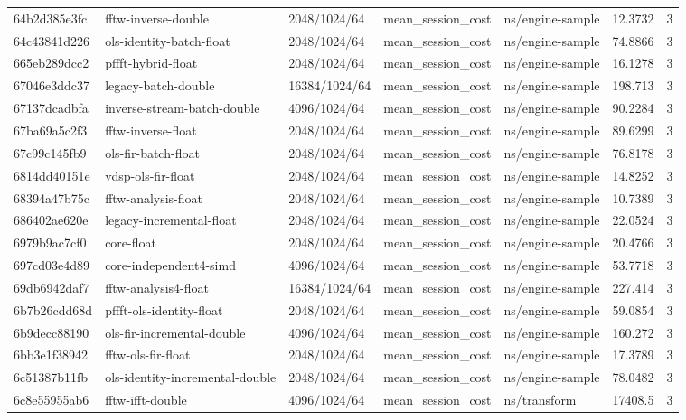\begin{longtable}{lllllrr}
64b2d385e3fc & fftw-inverse-double & 2048/1024/64 & mean\_session\_cost & ns/engine-sample & 12.3732 & 3 \\
64c43841d226 & ols-identity-batch-float & 2048/1024/64 & mean\_session\_cost & ns/engine-sample & 74.8866 & 3 \\
665eb289dcc2 & pffft-hybrid-float & 2048/1024/64 & mean\_session\_cost & ns/engine-sample & 16.1278 & 3 \\
67046e3ddc37 & legacy-batch-double & 16384/1024/64 & mean\_session\_cost & ns/engine-sample & 198.713 & 3 \\
67137dcadbfa & inverse-stream-batch-double & 4096/1024/64 & mean\_session\_cost & ns/engine-sample & 90.2284 & 3 \\
67ba69a5c2f3 & fftw-inverse-float & 2048/1024/64 & mean\_session\_cost & ns/engine-sample & 89.6299 & 3 \\
67c99c145fb9 & ols-fir-batch-float & 2048/1024/64 & mean\_session\_cost & ns/engine-sample & 76.8178 & 3 \\
6814dd40151e & vdsp-ols-fir-float & 2048/1024/64 & mean\_session\_cost & ns/engine-sample & 14.8252 & 3 \\
68394a47b75c & fftw-analysis-float & 2048/1024/64 & mean\_session\_cost & ns/engine-sample & 10.7389 & 3 \\
686402ae620e & legacy-incremental-float & 2048/1024/64 & mean\_session\_cost & ns/engine-sample & 22.0524 & 3 \\
6979b9ac7cf0 & core-float & 2048/1024/64 & mean\_session\_cost & ns/engine-sample & 20.4766 & 3 \\
697cd03e4d89 & core-independent4-simd & 4096/1024/64 & mean\_session\_cost & ns/engine-sample & 53.7718 & 3 \\
69db6942daf7 & fftw-analysis4-float & 16384/1024/64 & mean\_session\_cost & ns/engine-sample & 227.414 & 3 \\
6b7b26cdd68d & pffft-ols-identity-float & 2048/1024/64 & mean\_session\_cost & ns/engine-sample & 59.0854 & 3 \\
6b9decc88190 & ols-fir-incremental-double & 4096/1024/64 & mean\_session\_cost & ns/engine-sample & 160.272 & 3 \\
6bb3e1f38942 & fftw-ols-fir-float & 2048/1024/64 & mean\_session\_cost & ns/engine-sample & 17.3789 & 3 \\
6c51387b11fb & ols-identity-incremental-double & 2048/1024/64 & mean\_session\_cost & ns/engine-sample & 78.0482 & 3 \\
6c8e55955ab6 & fftw-ifft-double & 4096/1024/64 & mean\_session\_cost & ns/transform & 17408.5 & 3 \\

\end{longtable}
